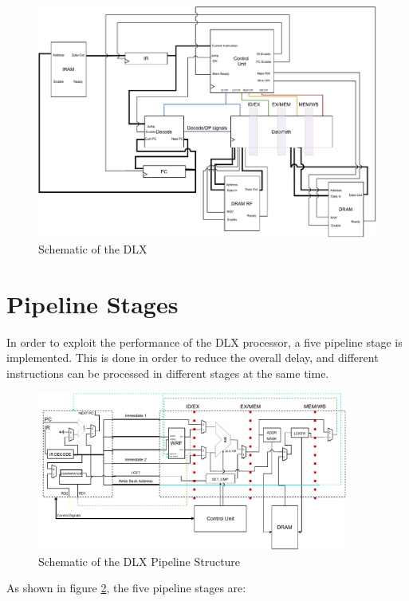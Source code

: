 \begin{figure}[ht]
    \centering
    \includegraphics[width=1\textwidth]{chapters/2_dlx/images/DLX.pdf}
    \caption{Schematic of the DLX}
    \label{DLX}
\end{figure} 

\newpage
\section{Pipeline Stages}

In order to exploit the performance of the DLX processor, a five pipeline stage is implemented. This is done in order to reduce the overall delay, and different instructions can be processed in different stages at the same time.

\begin{figure}[H]
    \centering
    \includegraphics[width=0.91\textwidth]{chapters/2_dlx/images/DLX_DP.pdf}
    \caption{Schematic of the DLX Pipeline Structure}
    \label{DLX_DP}
\end{figure} 

As shown in figure \ref{DLX_DP}, the five pipeline stages are:

